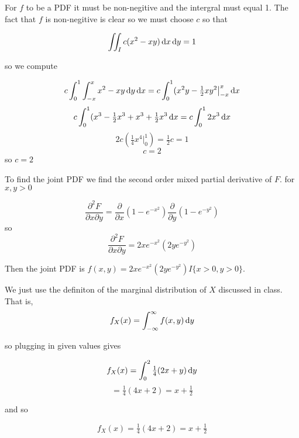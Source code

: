 \documentclass[11pt,largemargins]{homework}
\newcommand{\pp}{\frac{\partial^2 F}{\partial x \partial y} }
\newcommand{\px}{\frac{\partial }{\partial x} }
\newcommand{\py}{\frac{\partial }{\partial y} }
\begin{document}
\maketitle

\question
For $f$ to be a PDF it must be non-negitive and the intergral must equal 1. The fact that $f$ is non-negitive is clear so we 
must choose $c$ so that 

\[ \iint_I c(x^2 - xy) \dif x \dif y= 1 \] 

so we compute 

\[ c \int_0^1  \int_{-x}^{x} x^2 - xy \dif y \dif x = c \int_{0}^1 (x^2y - \tfrac{1}{2}xy^2\big|_{-x}^{x} \dif x \]
\[c\int_{0}^1 (x^3 - \tfrac{1}{2}x^3 + x^3 + \tfrac{1}{2}x^3  \dif x = c \int_{0}^1 2x^3 \dif x\] 
\[2c(\tfrac{1}{4} x^4 \big|_0^1) = \tfrac{1}{2}c = 1 \]
\[ c = 2 \] 
so $c = 2 $


\question 
To find the joint PDF we find the second order mixed partial derivative of $F$. 
for $x, y > 0$ 

\[\pp = \px (1 - e^{-x^2}) \py (1 - e^{-y^2})\]
so 
\[\pp = 2xe^{-x^2}(2ye^{-y^2})\]

Then the joint PDF is $f(x, y) = 2xe^{-x^2}(2ye^{-y^2})I\{x > 0, y > 0\}$.

\question
We just use the definiton of the marginal distribution of $X$ discussed in class. That is, 
\[f_X(x) = \int_{-\infty}^{\infty} f(x, y) \dif y \] 

so plugging in given values gives 

\[f_X(x) = \int_0^2 \tfrac{1}{4}(2x + y) \dif y \]
\[ = \tfrac{1}{4}(4x + 2) = x + \tfrac{1}{2} \] 

and so 

\[ f_X(x) =\tfrac{1}{4}(4x + 2) = x + \tfrac{1}{2} \]
\end{document}
